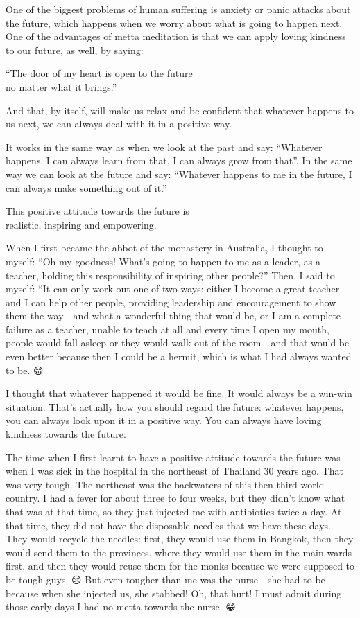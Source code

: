 \documentclass[12pt, openany]{book}
\newenvironment{aphorism}%
{%
\begin{center}\begin{itshape}
}%
{\end{itshape}\end{center}
}%
\begin{document}
One of the biggest problems of human suffering is anxiety or panic attacks about the future, which happens when we worry about what is going to happen next. One of the advantages of metta meditation is that we can apply loving kindness to our future, as well, by saying: 

\begin{aphorism}
“The door of my heart is open to the future\\  
no matter what it brings.” 
\end{aphorism}

And that, by itself, will make us relax and be confident that whatever happens to us next, we can always deal with it in a positive way. 

It works in the same way as when we look at the past and say: “Whatever happens, I can always learn from that, I can always grow from that”. In the same way we can look at the future and say: “Whatever happens to me in the future, I can always make something out of it.” 

\begin{aphorism}
This positive attitude towards the future is\\  
realistic, inspiring and empowering.
\end{aphorism}

When I first became the abbot of the monastery in Australia, I thought to myself: “Oh my goodness! What’s going to happen to me as a leader, as a teacher, holding this responsibility of inspiring other people?” Then, I said to myself: “It can only work out one of two ways: either I become a great teacher and I can help other people, providing leadership and encouragement to show them the way—and what a wonderful thing that would be, or I am a complete failure as a teacher, unable to teach at all and every time I open my mouth, people would fall asleep or they would walk out of the room—and that would be even better because then I could be a hermit, which is what I had always wanted to be. 😁 

I thought that whatever happened it would be fine. It would always be a win-win situation. That’s actually how you should regard the future: whatever happens, you can always look upon it in a positive way. You can always have loving kindness towards the future. 

The time when I first learnt to have a positive attitude towards the future was when I was sick in the hospital in the northeast of Thailand 30 years ago. That was very tough. The northeast was the backwaters of this then third-world country. I had a fever for about three to four weeks, but they didn’t know what that was at that time, so they just injected me with antibiotics twice a day. At that time, they did not have the disposable needles that we have these days. They would recycle the needles: first, they would use them in Bangkok, then they would send them to the provinces, where they would use them in the main wards first, and then they would reuse them for the monks because we were supposed to be tough guys. 😢 But even tougher than me was the nurse—she had to be because when she injected us, she stabbed! Oh, that hurt! I must admit during those early days I had no metta towards the nurse. 😁 
\end{document}
